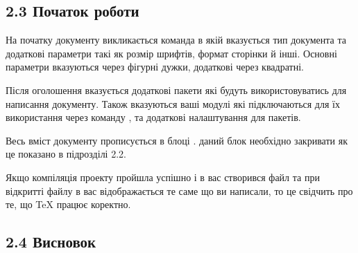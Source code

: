{\subsection{2.3 Початок роботи}
 \par
На початку документу викликається команда  в якій вказується тип документа та додаткові параметри такі як розмір шрифтів, формат сторінки й інші.
Основні параметри вказуються через фігурні дужки, додаткові через квадратні. \par
Після оголошення  вказується додаткові пакети які будуть використовуватись для написання документу.
Також вказуються ваші модулі які підключаються для їх використання через команду , та додаткові налаштування для пакетів. \par
Весь вміст документу прописується в блоці . даний блок необхідно закривати як це показано в підрозділі 2.2. \par
Якщо компіляція проекту пройшла успішно і в вас створився файл  та при відкритті файлу в вас відображається те саме що ви написали, то це свідчить про те, що TeX працює коректно. \par
% 
\subsection{2.4 Висновок}
 \par


\newpage
}